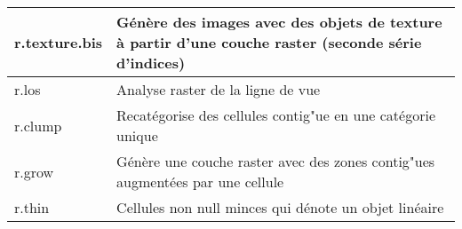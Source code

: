 \begin{table}[ht]
\begin{tabular}{|p{4cm}|p{12cm}|}
  \hline r.texture.bis & G\'en\`ere des images avec des objets de texture \`a partir d'une couche raster (seconde s\'erie d'indices)\\
  \hline r.los & Analyse raster de la ligne de vue\\
  \hline r.clump & Recat\'egorise des cellules contig"ue en une cat\'egorie unique \\
  \hline r.grow & G\'en\`ere une couche raster avec des zones contig"ues augment\'ees par une cellule\\
  \hline r.thin & Cellules non null minces qui d\'enote un objet lin\'eaire \\
\hline
\end{tabular}
\end{table}

